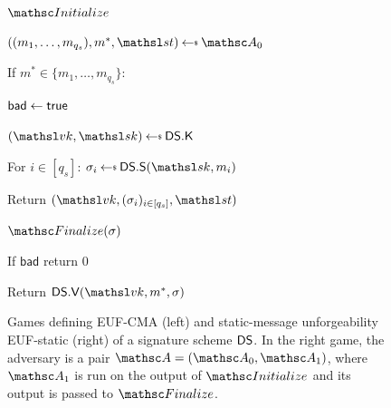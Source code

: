\begin{figure}[t]
{

\begin{oracle}{$\Initialize$}
\item $((m_1,\ldots,m_{q_s}),m^*,\state) \getsr \advA_0$
\item If $m^* \in \{m_1,\ldots,m_{q_s}\}$:
\item \quad $\mathsf{bad} \gets \mathsf{true}$
\item $(\vkey,\skey) \getsr \SigKeys$
\item For $i \in [q_s]$: $\sigma_i \getsr \SigSign(\skey,m_i)$
\item Return $(\vkey,(\sigma_i)_{i \in [q_s]},\state)$
\end{oracle}
\ExptSepSpace

\begin{oracle}{$\Finalize{(\sigma)}$}
\item If $\mathsf{bad}$ return 0
\item Return $\SigVf(\vkey,m^*,\sigma)$
\end{oracle}
}
\vspace{-12pt}
	\caption{Games defining EUF-CMA (left) and static-message unforgeability EUF-static (right) of a signature scheme $\mathsf{DS}$. In the right game, the adversary is a pair $\advA = (\advA_0,\advA_1)$, where $\advA_1$ is run on the output of $\Initialize$ and its output is passed to $\Finalize$.}\label{fig-eufcma}
	\vspace{-3pt}\hrulefill
	\vspace{-1ex}
\end{figure}

